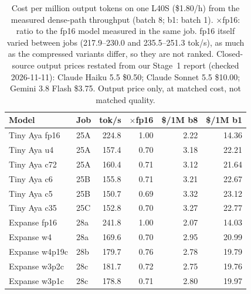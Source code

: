 \begin{table}[t]
\centering\footnotesize
\setlength{\tabcolsep}{3pt}
\begin{tabular}{@{}l l r r r r@{}}
\toprule
Model & Job & tok/s & $\times$fp16 & \$/1M b8 & \$/1M b1 \\
\midrule
Tiny Aya fp16 & 25A & 224.8 & 1.00 & 2.22 & 14.36 \\
Tiny Aya u4 & 25A & 157.4 & 0.70 & 3.18 & 22.21 \\
Tiny Aya c72 & 25A & 160.4 & 0.71 & 3.12 & 21.64 \\
Tiny Aya c6 & 25B & 155.8 & 0.71 & 3.21 & 22.67 \\
Tiny Aya c5 & 25B & 150.7 & 0.69 & 3.32 & 23.12 \\
Tiny Aya c35 & 25C & 152.8 & 0.70 & 3.27 & 22.77 \\
\midrule
Expanse fp16 & 28a & 241.8 & 1.00 & 2.07 & 14.03 \\
Expanse w4 & 28a & 169.6 & 0.70 & 2.95 & 20.99 \\
Expanse w4p19c & 28b & 179.7 & 0.76 & 2.78 & 19.79 \\
Expanse w3p2c & 28c & 181.7 & 0.72 & 2.75 & 19.76 \\
Expanse w3p1c & 28c & 178.8 & 0.71 & 2.80 & 19.97 \\
\bottomrule
\end{tabular}
\caption{Cost per million output tokens on one L40S (\$1.80/h) from the measured dense-path throughput (batch 8; b1: batch 1). $\times$fp16: ratio to the fp16 model measured in the same job. fp16 itself varied between jobs (217.9--230.0 and 235.5--251.3 tok/s), as much as the compressed variants differ, so they are not ranked. Closed-source output prices restated from our Stage~1 report (checked 2026-11-11): Claude Haiku 5.5 \$0.50; Claude Sonnet 5.5 \$10.00; Gemini 3.8 Flash \$3.75. Output price only, at matched cost, not matched quality.}
\label{tab:roi}
\end{table}
